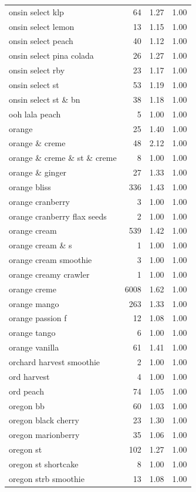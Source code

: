 \begin{table}
\begin{tabular}{lrrr}
onsin select klp & 64 & 1.27 & 1.00 \\
onsin select lemon & 13 & 1.15 & 1.00 \\
onsin select peach & 40 & 1.12 & 1.00 \\
onsin select pina colada & 26 & 1.27 & 1.00 \\
onsin select rby & 23 & 1.17 & 1.00 \\
onsin select st & 53 & 1.19 & 1.00 \\
onsin select st \& bn & 38 & 1.18 & 1.00 \\
ooh lala peach & 5 & 1.00 & 1.00 \\
orange & 25 & 1.40 & 1.00 \\
orange \& creme & 48 & 2.12 & 1.00 \\
orange \& creme \& st \& creme & 8 & 1.00 & 1.00 \\
orange \& ginger & 27 & 1.33 & 1.00 \\
orange bliss & 336 & 1.43 & 1.00 \\
orange cranberry & 3 & 1.00 & 1.00 \\
orange cranberry flax seeds & 2 & 1.00 & 1.00 \\
orange cream & 539 & 1.42 & 1.00 \\
orange cream \& s & 1 & 1.00 & 1.00 \\
orange cream smoothie & 3 & 1.00 & 1.00 \\
orange creamy crawler & 1 & 1.00 & 1.00 \\
orange creme & 6008 & 1.62 & 1.00 \\
orange mango & 263 & 1.33 & 1.00 \\
orange passion f & 12 & 1.08 & 1.00 \\
orange tango & 6 & 1.00 & 1.00 \\
orange vanilla & 61 & 1.41 & 1.00 \\
orchard harvest smoothie & 2 & 1.00 & 1.00 \\
ord harvest & 4 & 1.00 & 1.00 \\
ord peach & 74 & 1.05 & 1.00 \\
oregon bb & 60 & 1.03 & 1.00 \\
oregon black cherry & 23 & 1.30 & 1.00 \\
oregon marionberry & 35 & 1.06 & 1.00 \\
oregon st & 102 & 1.27 & 1.00 \\
oregon st shortcake & 8 & 1.00 & 1.00 \\
oregon strb smoothie & 13 & 1.08 & 1.00 \\

\end{tabular}
\end{table}
